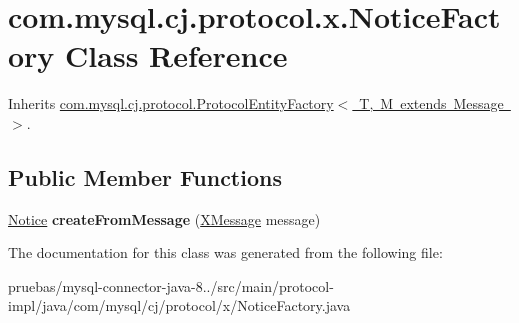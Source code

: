 \hypertarget{classcom_1_1mysql_1_1cj_1_1protocol_1_1x_1_1_notice_factory}{}\section{com.\+mysql.\+cj.\+protocol.\+x.\+Notice\+Factory Class Reference}
\label{classcom_1_1mysql_1_1cj_1_1protocol_1_1x_1_1_notice_factory}


Inherits \mbox{\hyperlink{interfacecom_1_1mysql_1_1cj_1_1protocol_1_1_protocol_entity_factory}{com.\+mysql.\+cj.\+protocol.\+Protocol\+Entity\+Factory$<$ T, M extends Message $>$}}.

\subsection*{Public Member Functions}
\begin{DoxyCompactItemize}
\item 
\mbox{\label{classcom_1_1mysql_1_1cj_1_1protocol_1_1x_1_1_notice_factory_a4252032a446a845265c41258852d08e9}} 
\mbox{\hyperlink{classcom_1_1mysql_1_1cj_1_1protocol_1_1x_1_1_notice}{Notice}} {\bfseries create\+From\+Message} (\mbox{\hyperlink{classcom_1_1mysql_1_1cj_1_1protocol_1_1x_1_1_x_message}{X\+Message}} message)
\end{DoxyCompactItemize}


The documentation for this class was generated from the following file\+:\begin{DoxyCompactItemize}
\item 
pruebas/mysql-\/connector-\/java-\/8../src/main/protocol-\/impl/java/com/mysql/cj/protocol/x/Notice\+Factory.\+java\end{DoxyCompactItemize}
